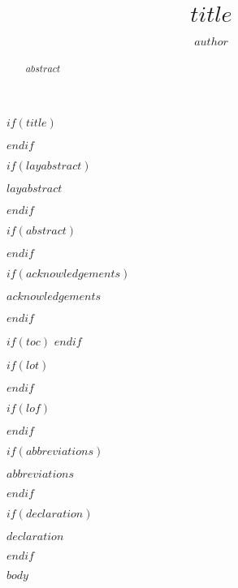 \documentclass[12pt,twoside]{Mactemplate}
\title{$title$}
\author{$author$}
\begin{document}
\frontmatter %
$if(title)$
  \maketitle
$endif$


$if(layabstract)$
  \begin{layabstract}
    $layabstract$
    \thispagestyle{plain}
  \end{layabstract}
$endif$

$if(abstract)$
  \begin{abstract}
    $abstract$
    \thispagestyle{plain}
  \end{abstract}
$endif$

$if(acknowledgements)$
  \begin{acknowledgements}
    $acknowledgements$
    \thispagestyle{plain}
  \end{acknowledgements}
$endif$

$if(toc)$
  \hypersetup{linkcolor=$if(toccolor)$$toccolor$$else$black$endif$}
  \setcounter{tocdepth}{$toc-depth$}
  \tableofcontents
  \thispagestyle{plain}
$endif$

$if(lot)$
  \listoftables
  \thispagestyle{plain}
$endif$

$if(lof)$
  \listoffigures
  \thispagestyle{plain}
$endif$

$if(abbreviations)$
  \begin{abbreviations}
    $abbreviations$
    \thispagestyle{plain}
  \end{abbreviations}
$endif$

$if(declaration)$
  \begin{declaration}
    $declaration$
    \thispagestyle{plain}
  \end{declaration}
$endif$



\mainmatter %

$body$


\end{document}
